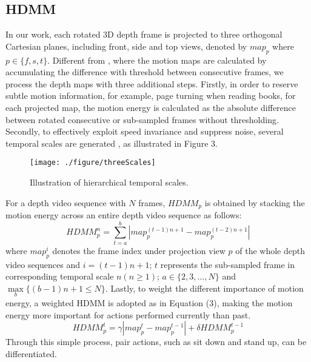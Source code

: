 \documentclass[conference]{IEEEtran}
\begin{document}
\subsection{HDMM}

In our work, each rotated 3D depth frame is projected to three orthogonal Cartesian planes, including front, side and top views, denoted by $map_{p}$ where $p \in \{f, s, t\}$. Different from \cite{Yang2012a}, where the motion maps are calculated by accumulating the difference with threshold between consecutive frames, we process the depth maps with three additional steps. Firstly, in order to reserve subtle motion information, for example, page turning when reading books, for each projected map, the motion energy is calculated as the absolute difference between rotated consecutive or sub-sampled frames without thresholding. Secondly, to effectively exploit speed invariance and suppress noise, several temporal scales are generated , as illustrated in Figure 3.
\begin{figure}[!ht]
\begin{center}{\texttt{[image: ./figure/threeScales]}}
\end{center}
\caption{Illustration of hierarchical temporal scales.}
\label{fig:framework}
\end{figure}
For a depth video sequence with $N$ frames, $HDMM_{p}$ is obtained by stacking the motion energy across an entire depth video sequence as follows:
\begin{equation}
HDMM_{p}^{n} = \sum_{t=a}^{b} \left| map_{p}^{(t-1)n + 1} - map_{p}^{(t-2)n + 1} \right|
\end{equation}
where $map_{p}^{i}$ denotes the frame index under projection view $p$ of the whole depth video sequences and $i = (t-1)n + 1$; $t$ represents the sub-sampled frame in corresponding temporal scale $n (n \geq 1)$; $a \in \{2, 3, ..., N\}$ and $\max \limits_{b}\{(b - 1)n + 1 \leq N\}$. Lastly, to weight the different importance of motion energy, a weighted HDMM is adopted as in Equation (3), making the motion energy more important for actions performed currently than past.
\begin{equation}
HDMM_{p}^{t} = \gamma \left| map_{p}^{t} - map_{p}^{t-1} \right | + \delta HDMM_{p}^{t-1}
\end{equation}
Through this simple process, pair actions, such as sit down and stand up, can be differentiated.
\end{document}
